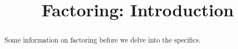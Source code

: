 \documentclass{ximera}
\title{Factoring: Introduction}
\begin{document}
\begin{abstract}
    Some information on factoring before we delve into the specifics.
\end{abstract}
\maketitle

\end{document}
